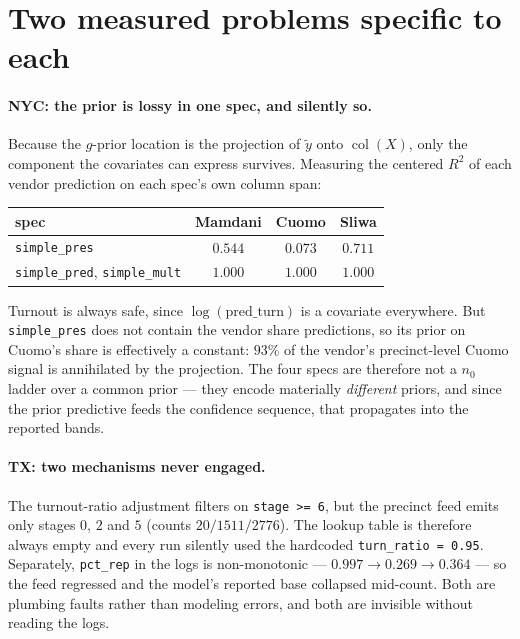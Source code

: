 \documentclass[11pt]{article}
\begin{document}
\section{Two measured problems specific to each}\label{sec:probs}

\paragraph{NYC: the prior is lossy in one spec, and silently so.} Because the $g$-prior
location is the projection of $\tilde y$ onto $\operatorname{col}(X)$, only the component
the covariates can express survives. Measuring the centered $R^2$ of each vendor prediction
on each spec's own column span:

\begin{table}[ht]
\centering
\small
\begin{tabular}{@{}lccc@{}}
\toprule
spec & Mamdani & Cuomo & Sliwa \\
\midrule
\texttt{simple\_pres} & $0.544$ & $\mathbf{0.073}$ & $0.711$ \\
\texttt{simple\_pred}, \texttt{simple\_mult} & $1.000$ & $1.000$ & $1.000$ \\
\bottomrule
\end{tabular}
\end{table}

\noindent Turnout is always safe, since $\log(\textrm{pred\_turn})$ is a covariate
everywhere. But \texttt{simple\_pres} does not contain the vendor share predictions, so its
prior on Cuomo's share is effectively a constant: $93\%$ of the vendor's precinct-level
Cuomo signal is annihilated by the projection. The four specs are therefore not a
$n_0$ ladder over a common prior --- they encode materially \emph{different} priors, and
since the prior predictive feeds the confidence sequence, that propagates into the
reported bands.

\paragraph{TX: two mechanisms never engaged.} The turnout-ratio adjustment filters on
\texttt{stage >= 6}, but the precinct feed emits only stages $0$, $2$ and $5$ (counts
$20/1511/2776$). The lookup table is therefore always empty and every run silently used the
hardcoded \texttt{turn\_ratio = 0.95}. Separately, \texttt{pct\_rep} in the logs is
non-monotonic --- $0.997 \to 0.269 \to 0.364$ --- so the feed regressed and the model's
reported base collapsed mid-count. Both are plumbing faults rather than modeling errors,
and both are invisible without reading the logs.
\end{document}
